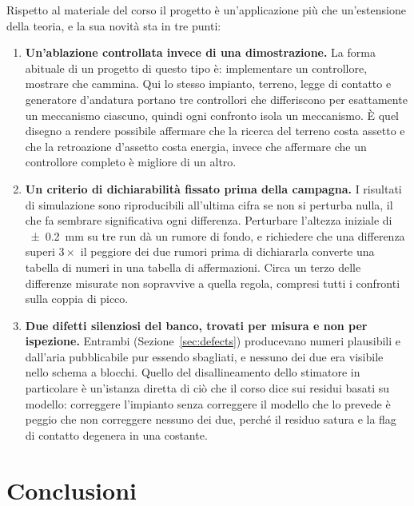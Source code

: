 \documentclass[11pt,a4paper]{article}
\begin{document}
Rispetto al materiale del corso il progetto \`e un'applicazione pi\`u che
un'estensione della teoria, e la sua novit\`a sta in tre punti:

\begin{enumerate}
\item \textbf{Un'ablazione controllata invece di una dimostrazione.} La forma
abituale di un progetto di questo tipo \`e: implementare un controllore,
mostrare che cammina. Qui lo stesso impianto, terreno, legge di contatto e
generatore d'andatura portano tre controllori che differiscono per esattamente
un meccanismo ciascuno, quindi ogni confronto isola un meccanismo. \`E quel
disegno a rendere possibile affermare che la ricerca del terreno costa assetto
e che la retroazione d'assetto costa energia, invece che affermare che un
controllore completo \`e migliore di un altro.

\item \textbf{Un criterio di dichiarabilit\`a fissato prima della campagna.} I
risultati di simulazione sono riproducibili all'ultima cifra se non si perturba
nulla, il che fa sembrare significativa ogni differenza. Perturbare l'altezza
iniziale di \SI{\pm 0.2}{\milli\meter} su tre run d\`a un rumore di fondo, e
richiedere che una differenza superi $3\times$ il peggiore dei due rumori prima
di dichiararla converte una tabella di numeri in una tabella di affermazioni.
Circa un terzo delle differenze misurate non sopravvive a quella regola,
compresi tutti i confronti sulla coppia di picco.

\item \textbf{Due difetti silenziosi del banco, trovati per misura e non per
ispezione.} Entrambi (Sezione~\ref{sec:defects}) producevano numeri plausibili
e dall'aria pubblicabile pur essendo sbagliati, e nessuno dei due era visibile
nello schema a blocchi. Quello del disallineamento dello stimatore in
particolare \`e un'istanza diretta di ci\`o che il corso dice sui residui basati
su modello: correggere l'impianto senza correggere il modello che lo prevede \`e
peggio che non correggere nessuno dei due, perch\'e il residuo satura e la flag
di contatto degenera in una costante.
\end{enumerate}

\section{Conclusioni}
\label{sec:conclusions}
\end{document}
